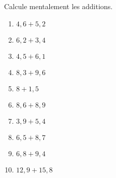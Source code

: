 \begin{exercice}
Calcule mentalement les additions.
\begin{enumerate} 
 \item $4,6 + 5,2$ \dotfill \hspace*{12em}
 
 \item $6,2 + 3,4$ \dotfill \hspace*{12em}
 
 \item $4,5 + 6,1$ \dotfill \hspace*{12em}
 
 \item $8,3 + 9,6$ \dotfill \hspace*{12em}
 
 \item $8 + 1,5$ \dotfill \hspace*{12em}
 
 \item $8,6 + 8,9$ \dotfill \hspace*{12em}
 
 \item $3,9 + 5,4$ \dotfill \hspace*{12em}
 
 \item $6,5 + 8,7$ \dotfill \hspace*{12em}
 
 \item $6,8 + 9,4$ \dotfill \hspace*{12em}
 
 \item \hspace{0.1em} $12,9 + 15,8$ \dotfill \hspace*{12em} %

 \end{enumerate}
\end{exercice}


